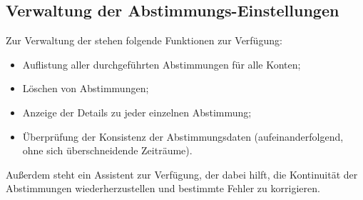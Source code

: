 \subsection{Verwaltung der Abstimmungs-Einstellungen\label{reconciliation-manage-parameters}}

Zur Verwaltung der  stehen folgende Funktionen zur Verfügung:
\begin{itemize}
	\item Auflistung aller durchgeführten Abstimmungen für alle Konten;
	\item Löschen von Abstimmungen;
	\item Anzeige der Details zu jeder einzelnen Abstimmung;
	\item Überprüfung der Konsistenz der Abstimmungsdaten (aufeinanderfolgend, ohne sich überschneidende Zeiträume).
\end{itemize}

Außerdem steht ein Assistent zur Verfügung, der dabei hilft, die Kontinuität der Abstimmungen wiederherzustellen und bestimmte Fehler zu korrigieren.

